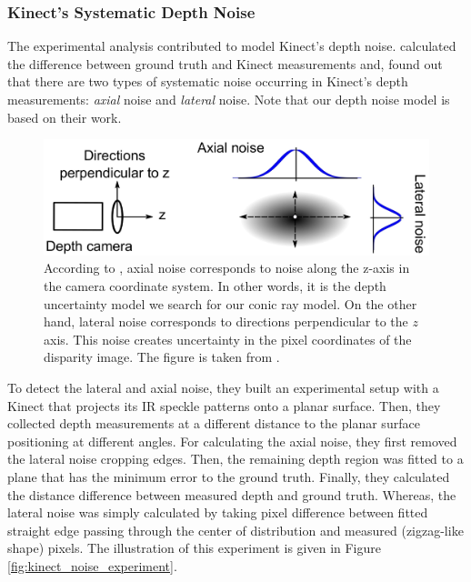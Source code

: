 \documentclass[a4paper]{report}
\numberwithin{figure}{section}
\begin{document}
\subsubsection{Kinect's Systematic Depth Noise}

The experimental analysis contributed to model Kinect's depth noise.
\parencite{Nguyen2012a} calculated the difference between ground truth and 
Kinect
measurements and,  found out that there are two types of systematic noise
occurring in Kinect's depth measurements: \textit{axial} noise and
\textit{lateral} noise.  Note that our depth noise model is based on their
work.


\begin{figure}[H] \centering
\includegraphics[width=0.7\linewidth,natwidth=640,natheight=640]
{fig/ref_imgs/kinect_noise_model.png} \caption[Kinect's Depth Noise
Model]{According to \parencite{Nguyen2012a}, axial noise corresponds to noise 
along
the z-axis in the camera coordinate system. In other words, it is the depth
uncertainty model we search for our conic ray model.  On the other hand,
lateral noise corresponds to directions perpendicular to the $z$ axis. This
noise creates uncertainty in the pixel coordinates of the disparity image.
The figure is taken from \parencite{Nguyen2012a}.} 
\label{fig:kinect_noise_model}
\end{figure}

To detect the lateral and axial noise, they built an experimental setup with a
Kinect that projects its IR speckle patterns onto a planar surface.  Then, they
collected depth measurements at a different distance to the planar surface
positioning at different angles.  For calculating the axial noise, they first
removed the lateral noise cropping edges. Then, the remaining depth region was
fitted to a plane that has the minimum error to the ground truth. Finally, they
calculated the distance difference between measured depth and ground truth.
Whereas, the lateral noise was simply calculated by taking pixel difference
between fitted straight edge passing through the center of distribution and
measured (zigzag-like shape) pixels. The illustration of this experiment is
given in Figure \ref{fig:kinect_noise_experiment}.
\end{document}
